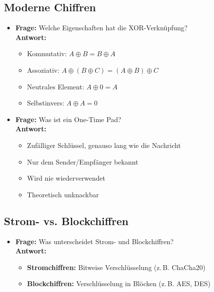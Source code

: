\documentclass[a4paper,12pt]{article}
\begin{document}
\subsection*{Moderne Chiffren}
\begin{itemize}[leftmargin=*]
  \item \textbf{Frage:} Welche Eigenschaften hat die XOR-Verknüpfung?\\
  \textbf{Antwort:}
  \begin{itemize}
    \item Kommutativ: \(A \oplus B = B \oplus A\)
    \item Assoziativ: \(A \oplus (B \oplus C) = (A \oplus B) \oplus C\)
    \item Neutrales Element: \(A \oplus 0 = A\)
    \item Selbstinvers: \(A \oplus A = 0\)
  \end{itemize}

  \item \textbf{Frage:} Was ist ein One-Time Pad?\\
  \textbf{Antwort:}
  \begin{itemize}
    \item Zufälliger Schlüssel, genauso lang wie die Nachricht
    \item Nur dem Sender/Empfänger bekannt
    \item Wird nie wiederverwendet
    \item Theoretisch unknackbar
  \end{itemize}
\end{itemize}

\subsection*{Strom- vs. Blockchiffren}
\begin{itemize}[leftmargin=*]
  \item \textbf{Frage:} Was unterscheidet Strom- und Blockchiffren?\\
  \textbf{Antwort:}
  \begin{itemize}
    \item \textbf{Stromchiffren:} Bitweise Verschlüsselung (z. B. ChaCha20)
    \item \textbf{Blockchiffren:} Verschlüsselung in Blöcken (z. B. AES, DES)
  \end{itemize}
\end{itemize}
\end{document}
